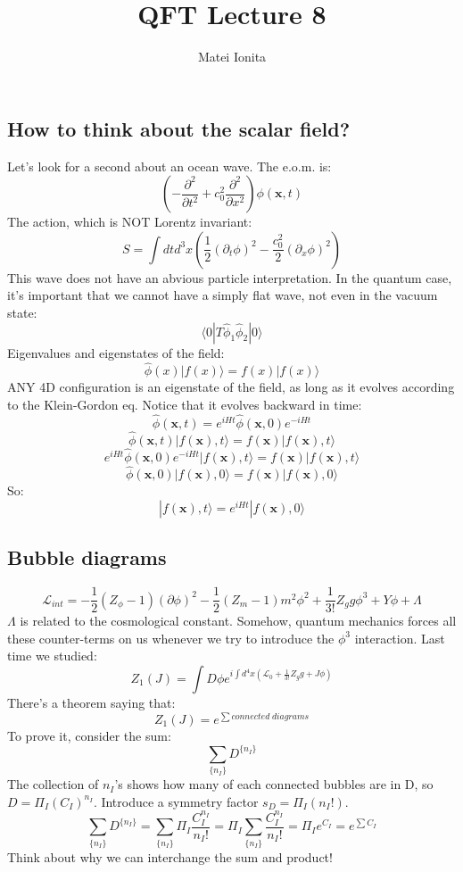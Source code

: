 \documentclass[12 pt]{article}
\title{QFT Lecture 8}
\author{Matei Ionita}
\begin{document}
  \maketitle

\subsection*{How to think about the scalar field?}

Let's look for a second about an ocean wave. The e.o.m. is:
\[ \left(  - \frac{\partial^2}{\partial t^2} + c_0^2 \frac{\partial^2}{\partial x^2} \right) \phi(\mathbf{x}, t) \]
The action, which is NOT Lorentz invariant:
\[  S = \int dt d^3x \left(  \frac{1}{2} (\partial_t \phi)^2 - \frac{c_0^2}{2} (\partial_x \phi)^2  \right)  \]
This wave does not have an abvious particle interpretation. In the quantum case, it's important that we cannot have a simply flat wave, not even in the vacuum state:
\[  \langle 0 | T \hat \phi_1 \hat \phi_2 | 0 \rangle \]
Eigenvalues and eigenstates of the field:
\[  \hat \phi (x) |f(x)\rangle = f(x) |f(x)\rangle  \]
ANY 4D configuration is an eigenstate of the field, as long as it evolves according to the Klein-Gordon eq. Notice that it evolves backward in time:
\[  \hat \phi (\mathbf{x}, t) = e^{iHt} \hat\phi (\mathbf{x}, 0) e^{-iHt}  \]
\[  \hat \phi (\mathbf{x}, t) |f (\mathbf{x}), t\rangle = f (\mathbf{x}) |f (\mathbf{x}), t\rangle  \]
\[  e^{iHt} \hat\phi (\mathbf{x}, 0) e^{-iHt} |f (\mathbf{x}), t\rangle = f (\mathbf{x}) |f (\mathbf{x}), t\rangle  \]
\[  \hat \phi (\mathbf{x}, 0) |f (\mathbf{x}), 0\rangle = f (\mathbf{x}) |f (\mathbf{x}),0\rangle  \]
So:
\[  |f (\mathbf{x}), t\rangle = e^{iHt} |f (\mathbf{x}), 0\rangle  \]

\subsection*{Bubble diagrams}

\[   \mathcal{L}_{int} = - \frac{1}{2} (Z_{\phi} - 1) (\partial \phi)^2 - \frac{1}{2} (Z_{m} - 1) m^2 \phi^2 + \frac{1}{3!}Z_g g \phi^3 + Y\phi + \Lambda \]
$\Lambda$ is related to the cosmological constant. Somehow, quantum mechanics forces all these counter-terms on us whenever we try to introduce the $\phi^3$ interaction. Last time we studied:
\[  Z_1(J) = \int D\phi e^{i\int d^4 x (\mathcal{L}_0 + \frac{1}{3!} Z_g g + J\phi)}  \]
There's a theorem saying that:
\[   Z_1(J) = e^{\sum connected\;diagrams}  \]
To prove it, consider the sum:
\[  \sum_{\{n_I\}} D^{\{n_I\}}  \]
The collection of $n_I$'s shows how many of each connected bubbles are in D, so $D = \Pi_I (C_I)^{n_I}$. Introduce a symmetry factor $s_D = \Pi_I (n_I !)$.
\[  \sum_{\{n_I\}} D^{\{n_I\}} =  \sum_{\{n_I\}} \Pi_I \frac{C_I^{n_I}}{n_I!} = \Pi_I \sum_{\{n_I\}} \frac{C_I^{n_I}}{n_I!} = \Pi_I e^{C_I} = e^{\sum C_I} \]
Think about why we can interchange the sum and product!
\end{document}
